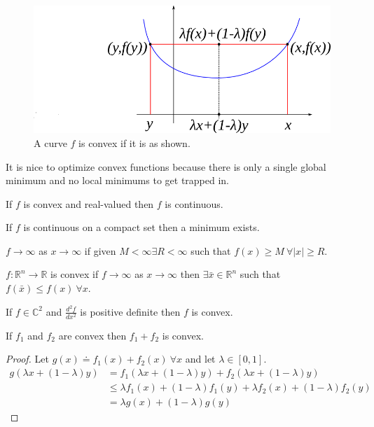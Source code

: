 \begin{figure}[ht!]
\centering
\includegraphics[width=.5\textwidth]{images/05convexGeoProof}
\caption{A curve $f$ is convex if it is as shown.}
\label{fig:05convexGeoProof}
\end{figure}

It is nice to optimize convex functions because there is only a single global minimum and no local minimums to get trapped in.

\begin{theorem}
If $f$ is convex and real-valued then $f$ is continuous.
\end{theorem}

\begin{theorem}
If $f$ is continuous on a compact set then a minimum exists.
\end{theorem}

\begin{definition}
$f\to\infty$ as $x\to\infty$ if given $M<\infty \exists R<\infty$ such that $f(x)\geq M~\forall |x|\geq R$.
\end{definition}

\begin{theorem}
$f:\mathbb{R}^n\to\mathbb{R}$ is convex if $f\to\infty$ as $x\to\infty$ then $\exists \bar{x}\in\mathbb{R}^n$ such that $f(\bar{x})\leq f(x)~\forall x$.
\end{theorem}

\begin{theorem}
If $f\in\mathbb{C}^2$ and $\frac{d^2f}{dx^2}$ is positive definite then $f$ is convex.
\end{theorem}

\begin{theorem}
\label{th:sumConvex}
If $f_1$ and $f_2$ are convex then $f_1+f_2$ is convex.
\end{theorem}

\begin{proof}
Let $g(x) \doteq f_1(x) + f_2(x)~\forall x$ and let $\lambda\in[0,1]$.
\begin{align*}
g(\lambda x + (1-\lambda)y) &= f_1(\lambda x+(1-\lambda)y) + f_2(\lambda x+(1-\lambda)y) \\
&\leq \lambda f_1(x) + (1-\lambda)f_1(y) + \lambda f_2(x) + (1-\lambda)f_2(y) \\
&= \lambda g(x) + (1-\lambda)g(y)
\end{align*}
\end{proof}

